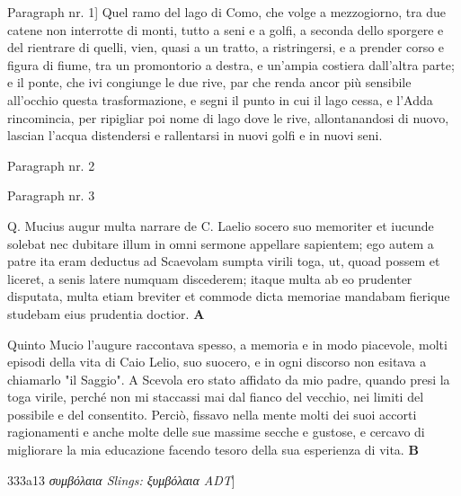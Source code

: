 \documentclass[b5paper]{book}
\begin{document}
\beginnumbering
\numberpstarttrue

\pstart
    Paragraph nr. 1] Quel ramo del lago di Como, che volge a mezzogiorno, tra due catene non interrotte di monti, tutto a seni e a golfi, a seconda dello sporgere e del rientrare di quelli, vien, quasi a un tratto, a ristringersi, e a prender corso e figura di fiume, tra un promontorio a destra, e un'ampia costiera dall'altra parte; e il ponte, che ivi congiunge le due rive, par che renda ancor più sensibile all'occhio questa trasformazione, e segni il punto in cui il lago cessa, e l'Adda rincomincia, per ripigliar poi nome di lago dove le rive, allontanandosi di nuovo, lascian l'acqua distendersi e rallentarsi in nuovi golfi e in nuovi seni.
\pend

\pstart%
    Paragraph nr. 2%
\pend

\pstart%
    Paragraph nr. 3%
\pend

\pausenumbering
\begin{pairs}
\begin{Leftside}
\resumenumbering
\numberpstartfalse
    \pstart\noindent Q. Mucius augur multa narrare de C. Laelio socero suo memoriter et iucunde solebat nec dubitare illum in omni sermone appellare sapientem; ego autem a patre ita eram deductus ad Scaevolam sumpta virili toga, ut, quoad possem et liceret, a senis latere numquam discederem; itaque multa ab eo prudenter disputata, multa etiam breviter et commode dicta memoriae mandabam fierique studebam eius prudentia doctior. \textbf{A}\pend
\pausenumbering
\end{Leftside}

\begin{Rightside}
\beginnumbering
\numberpstartfalse
    \pstart\noindent Quinto Mucio l'augure raccontava spesso, a memoria e in modo piacevole, molti episodi della vita di Caio Lelio, suo suocero, e in ogni discorso non esitava a chiamarlo "il Saggio". A Scevola ero stato affidato da mio padre, quando presi la toga virile, perché non mi staccassi mai dal fianco del vecchio, nei limiti del possibile e del consentito. Perciò, fissavo nella mente molti dei suoi accorti ragionamenti e anche molte delle sue massime secche e gustose, e cercavo di migliorare la mia educazione facendo tesoro della sua esperienza di vita. \textbf{B}\pend
\pausenumbering
\end{Rightside}
\end{pairs}
\Columns

\resumenumbering
\numberpstarttrue

\pstart {}333a13 \textit{συμβόλαια Slings: ξυμβόλαια ADT}]\pend
\end{document}
